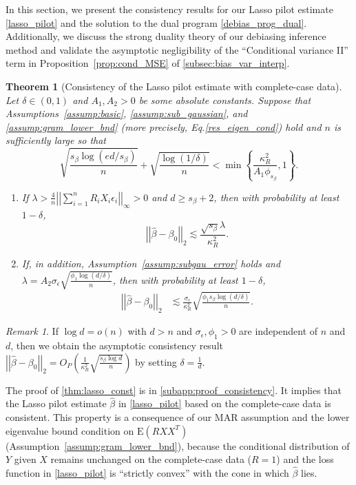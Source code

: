\documentclass[ejsv2,noshowframe]{imsart}
\theoremstyle{plain}
\newtheorem{theorem}{Theorem}[section]
\theoremstyle{definition}
\theoremstyle{remark}
\newtheorem{remark}{Remark}
\newcommand{\norm}[1]{\left|\left| #1 \right|\right|}
\renewcommand{\hat}{\widehat}
\begin{document}
In this section, we present the consistency results for our Lasso pilot estimate \eqref{lasso_pilot} and the solution to the dual program \eqref{debias_prog_dual}. Additionally, we discuss the strong duality theory of our debiasing inference method and validate the asymptotic negligibility of the ``Conditional variance II'' term in Proposition~\ref{prop:cond_MSE} of \autoref{subsec:bias_var_interp}.

\begin{theorem}[Consistency of the Lasso pilot estimate with complete-case data]
	\label{thm:lasso_const}
	Let $\delta \in (0,1)$ and $A_1,A_2>0$ be some absolute constants. Suppose that Assumptions~\ref{assump:basic}, \ref{assump:sub_gaussian}, and \ref{assump:gram_lower_bnd} (more precisely, Eq.\eqref{res_eigen_cond}) hold and $n$ is sufficiently large so that 
	$$\sqrt{\frac{s_{\beta}\log(ed/s_{\beta})}{n}} + \sqrt{\frac{\log(1/\delta)}{n}} < \min\left\{\frac{\kappa_R^2}{A_1 \phi_{s_{\beta}}}, 1 \right\}.$$
	\begin{enumerate}[label=(\alph*)]
		\item If $\lambda> \frac{4}{n}\norm{\sum_{i=1}^n R_iX_i\epsilon_i}_{\infty} >0$ and $d\geq s_{\beta}+2$, then with probability at least $1-\delta$,
		$$\norm{\hat{\beta}-\beta_0}_2 \lesssim \frac{\sqrt{s_{\beta}}\lambda}{\kappa_R^2}.$$ 
		
		\item If, in addition, Assumption~\ref{assump:subgau_error} holds and $\lambda = A_2\sigma_{\epsilon} \sqrt{\frac{\phi_1\log(d/\delta)}{n}}$, then with probability at least $1-\delta$,
		\begin{align*}
			\norm{\hat{\beta}-\beta_0}_2 &\lesssim \frac{ \sigma_{\epsilon}}{\kappa_R^2} \sqrt{\frac{\phi_1 s_{\beta}\log(d/\delta)}{n}}.
		\end{align*}
	\end{enumerate}
\end{theorem}

\begin{remark}
	\label{remark:lasso_const}
	If $\log d=o(n)$ with $d>n$ and $\sigma_{\epsilon},\phi_1>0$ are independent of $n$ and $d$, then we obtain the asymptotic consistency result $\norm{\hat{\beta}-\beta_0}_2 = O_P\left(\frac{1}{\kappa_R^2}\sqrt{\frac{s_{\beta}\log d}{n}}\right)$ by setting $\delta=\frac{1}{d}$.
\end{remark}

The proof of \autoref{thm:lasso_const} is in \autoref{subapp:proof_consistency}. It implies that the Lasso pilot estimate $\hat{\beta}$ in \eqref{lasso_pilot} based on the complete-case data is consistent. This property is a consequence of our MAR assumption and the lower eigenvalue bound condition on $\mathrm{E}(RXX^T)$ (Assumption~\ref{assump:gram_lower_bnd}), because the conditional distribution of $Y$ given $X$ remains unchanged on the complete-case data ($R=1$) and the loss function in \eqref{lasso_pilot} is ``strictly convex'' with the cone in which $\hat{\beta}$ lies. 
\end{document}
